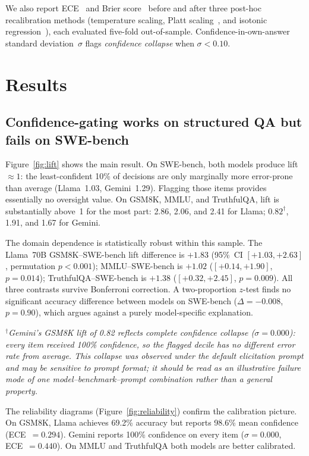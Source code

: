 \documentclass[10pt,twocolumn]{article}
\begin{document}
We also report ECE~\citep{guo2017} and Brier
score~\citep{brier1950,gneiting2007} before and after three post-hoc
recalibration methods (temperature scaling, Platt scaling~\citep{platt1999},
and isotonic regression~\citep{zadrozny2002}), each evaluated five-fold
out-of-sample. Confidence-in-own-answer standard deviation~$\sigma$ flags
\emph{confidence collapse} when $\sigma{<}0.10$.

\section{Results}

\subsection{Confidence-gating works on structured QA but fails on SWE-bench}

Figure~\ref{fig:lift} shows the main result. On SWE-bench, both models produce
lift~$\approx1$: the least-confident 10\% of decisions are only marginally more
error-prone than average (Llama~1.03, Gemini~1.29). Flagging those items
provides essentially no oversight value. On GSM8K, MMLU, and TruthfulQA, lift
is substantially above~1 for the most part: 2.86, 2.06, and 2.41 for Llama;
$0.82^\dagger$, 1.91, and 1.67 for Gemini.

The domain dependence is statistically robust within this sample. The
Llama~70B GSM8K--SWE-bench lift difference is $+1.83$ (95\%~CI
$[+1.03,+2.63]$, permutation $p{<}0.001$); MMLU--SWE-bench is $+1.02$
($[+0.14,+1.90]$, $p{=}0.014$); TruthfulQA--SWE-bench is $+1.38$
($[+0.32,+2.45]$, $p{=}0.009$). All three contrasts survive Bonferroni
correction. A two-proportion $z$-test finds no significant accuracy difference
between models on SWE-bench ($\Delta{=}{-}0.008$, $p{=}0.90$), which argues
against a purely model-specific explanation.

{\small\textit{$^\dagger$Gemini's GSM8K lift of 0.82 reflects complete
confidence collapse ($\sigma{=}0.000$): every item received 100\% confidence,
so the flagged decile has no different error rate from average. This collapse
was observed under the default elicitation prompt and may be sensitive to
prompt format; it should be read as an illustrative failure mode of one
model--benchmark--prompt combination rather than a general property.}}

The reliability diagrams (Figure~\ref{fig:reliability}) confirm the calibration
picture. On GSM8K, Llama achieves 69.2\% accuracy but reports 98.6\% mean
confidence (ECE~$=0.294$). Gemini reports 100\% confidence on every item
($\sigma{=}0.000$, ECE~$=0.440$). On MMLU and TruthfulQA both models are better
calibrated.
\end{document}
